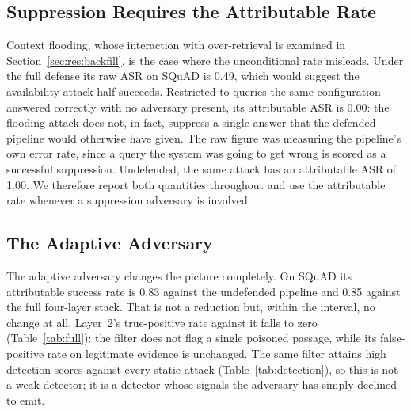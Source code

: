 \documentclass[information,article,submit,moreauthors]{Definitions/mdpi}
\newcommand{\casrAdaptiveSquadnone}{0.83}
\newcommand{\casrFloodingSquadnone}{1.00}
\newcommand{\casrAdaptiveSquadfull}{0.85}
\newcommand{\casrFloodingSquadfull}{0.00}
\newcommand{\asrFloodingSquadfull}{0.49}
\begin{document}
\subsection{Suppression Requires the Attributable Rate}
\label{sec:res:suppression}

Context flooding, whose interaction with over-retrieval is examined in
Section~\ref{sec:res:backfill}, is the case where the unconditional rate misleads. Under the full defense its
raw ASR on SQuAD is \asrFloodingSquadfull{}, which would suggest the availability attack
half-succeeds. Restricted to queries the same configuration answered correctly with no
adversary present, its attributable ASR is \casrFloodingSquadfull{}: the flooding attack does
not, in fact, suppress a single answer that the defended pipeline would otherwise have given.
The raw figure was measuring the pipeline's own error rate, since a query the system was going
to get wrong is scored as a successful suppression. Undefended, the same attack has an
attributable ASR of \casrFloodingSquadnone{}. We therefore report both quantities throughout
and use the attributable rate whenever a suppression adversary is involved.

\subsection{The Adaptive Adversary}
\label{sec:res:adaptive}

The adaptive adversary changes the picture completely. On SQuAD its attributable success rate
is \casrAdaptiveSquadnone{} against the undefended pipeline and \casrAdaptiveSquadfull{}
against the full four-layer stack. That is not a reduction but, within the interval, no
change at all.
Layer~2's true-positive rate against it falls to zero (Table~\ref{tab:full}): the filter does
not flag a single poisoned passage, while its false-positive rate on legitimate evidence is
unchanged. The same filter attains high detection scores against every static attack
(Table~\ref{tab:detection}), so this is not a weak detector; it is a detector whose signals the
adversary has simply declined to emit.
\end{document}
